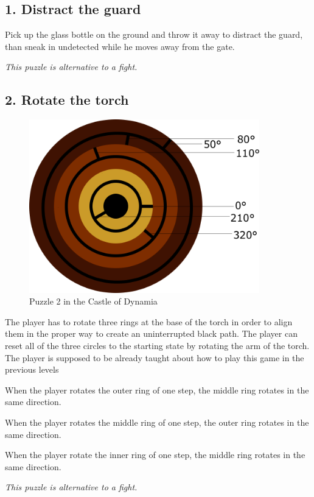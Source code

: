 \subsection{1. Distract the guard}

Pick up the glass bottle on the ground and throw it away to distract the guard, than sneak in undetected while he moves away from the gate.

\textit{This puzzle is alternative to a fight.}


\subsection{2. Rotate the torch}

\begin{figure}[H]
  \centering
  \includegraphics[width=10cm]{Images/Puzzles/castleOfDynamia2}
  \caption{Puzzle 2 in the Castle of Dynamia}
\end{figure}

The player has to rotate three rings at the base of the torch in order to align them in the proper way to create an uninterrupted black path. The player can reset all of the three circles to the starting state by rotating the arm of the torch. The player is supposed to be already taught about how to play this game in the previous levels

When the player rotates the outer ring of one step, the middle ring rotates in the same direction.

When the player rotates the middle ring of one step, the outer ring rotates in the same direction.

When the player rotate the inner ring of one step, the middle ring rotates in the same direction.

\textit{This puzzle is alternative to a fight.}

